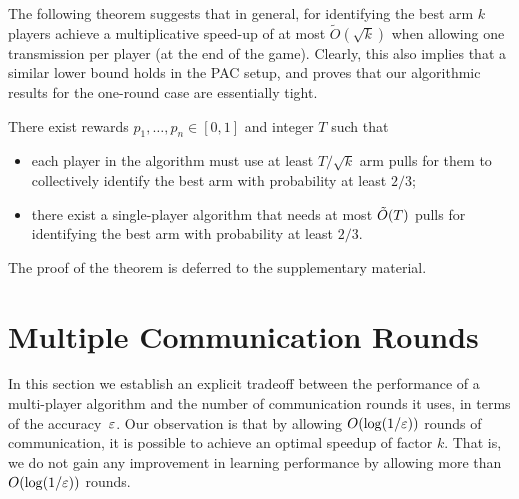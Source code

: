\documentclass{article} %
\begin{document}
The following theorem suggests that in general, for identifying the best arm $k$ players achieve a multiplicative speed-up of at most  $\tilde{O}(\sqrt{k})$ when allowing one transmission per player (at the end of the game). 
Clearly, this also implies that a similar lower bound holds in the PAC setup, and proves that our algorithmic results for the one-round case are essentially tight.    


\begin{theorem} \label{thm:lb1}
There exist rewards $p_1,\ldots,p_n \in [0,1]$ and integer $T$ such that
\begin{itemize}
\item
each player in the algorithm must use at least $T/\sqrt{k}$ arm pulls for
them to collectively identify the best arm with probability at least $2/3$;
\item
there exist a single-player algorithm that needs at most $\tilde{O}(T)$ pulls for
identifying the best arm with probability at least $2/3$.
\end{itemize}
\end{theorem}


The proof of the theorem is deferred to the supplementary material.




%
\section{Multiple Communication Rounds}
\label{sec:multiplerounds}


In this section we establish an explicit tradeoff between the performance of a multi-player
algorithm and the number of communication rounds it uses, in terms of the accuracy~$\varepsilon$.
Our observation is that by allowing $O(\log(1/\varepsilon))$ rounds of communication, it is possible to achieve an optimal speedup of factor $k$. That is, we do not gain any improvement in learning performance by allowing more than $O(\log(1/\varepsilon))$ rounds.
\end{document}
